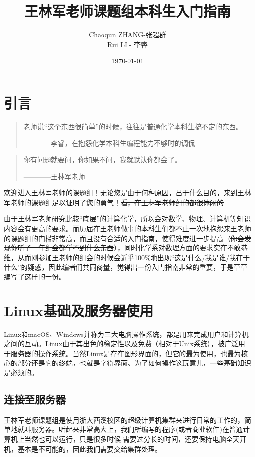 \documentclass{article}
\title{王林军老师课题组本科生入门指南}
\author{Chaoqun ZHANG-张超群\\Rui LI - 李睿}
\date{\today}
\numberwithin{equation}{section}
\begin{document}
    \maketitle
    \tableofcontents
    \newpage
    \section{引言}
  \begin{quote}
    老师说``这个东西很简单''的时候，往往是普通化学本科生搞不定的东西。
    \begin{flushright}
      ————李睿，在抱怨化学本科生编程能力不够时的调侃
    \end{flushright}
  \end{quote}
  \begin{quote}
    你有问题就要问，你如果不问，我就默认你都会了。
    \begin{flushright}
      ————王林军老师
    \end{flushright}
  \end{quote}

  欢迎进入王林军老师的课题组！无论您是由于何种原因，出于什么目的，来到王林军老师的课题组足以证明了您的勇气！\sout{看，在王林军老师组的都很休闲的}

  由于王林军老师研究比较``底层''的计算化学，所以会对数学、物理、计算机等知识内容会有更高的要求。而历届在王老师做事的本科生们都不止一次地抱怨来王老师的课题组的门槛非常高，而且没有合适的入门指南，使得难度进一步提高（\sout{你会发现你听了一年组会都学不到什么东西}），同时化学系对数理方面的要求实在不敢恭维，从而刚参加王老师的组会的时候会近乎100\%地出现``这是什么/我是谁/我在干什么''的疑惑，因此编者们共同商量，觉得出一份入门指南非常的重要，于是草草编写了这样的一份。

    \section{Linux基础及服务器使用}
    Linux和macOS、Windows并称为三大电脑操作系统，都是用来完成用户和计算机之间的互动。Linux由于其出色的稳定性以及免费（相对于Unix系统），被广泛用于服务器的操作系统。当然Linux是存在图形界面的，但它的最为使用，也最为核心的部分还是它的终端，也就是字符界面。为了如何操作这玩意儿，一些基础知识是必须的。

    \subsection{连接至服务器}
    王林军老师课题组是使用浙大西溪校区的超级计算机集群来进行日常的工作的，简单地就叫服务器。听起来非常高大上，我们所编写的程序(或者商业软件)在普通计算机上当然也可以运行，只是很多时候
    需要过分长的时间，还要保持电脑全天开机，基本是不可能的，因此我们需要交给集群处理。
\end{document}
